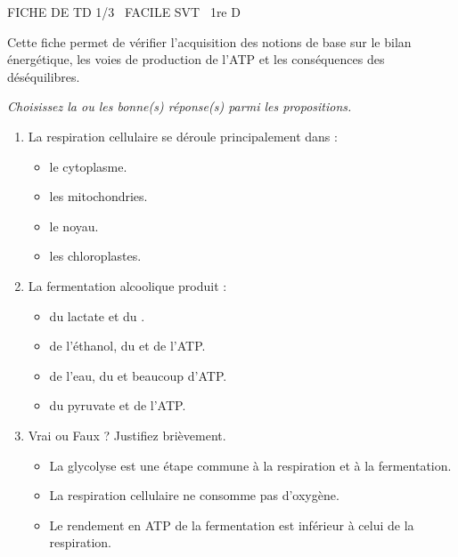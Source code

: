 \documentclass[11pt]{article}
\begin{document}
\begin{tcolorbox}[enhanced,colback=popink,colframe=popink,arc=10pt,boxrule=0pt,left=12pt,right=12pt,top=9pt,bottom=9pt]
{\color{white}\popxbold\small FICHE DE TD 1/3 \textbullet\ FACILE \hfill SVT \textbullet\ 1re D\par}
\end{tcolorbox}
\vspace{4pt}
Cette fiche permet de vérifier l'acquisition des notions de base sur le bilan énergétique, les voies de production de l'ATP et les conséquences des déséquilibres.

\begin{exercice}
\emph{Choisissez la ou les bonne(s) réponse(s) parmi les propositions.}
\begin{enumerate}
    \item La respiration cellulaire se déroule principalement dans :
    \begin{itemize}
        \item[A.] le cytoplasme.
        \item[B.] les mitochondries.
        \item[C.] le noyau.
        \item[D.] les chloroplastes.
    \end{itemize}
    \item La fermentation alcoolique produit :
    \begin{itemize}
        \item[A.] du lactate et du .
        \item[B.] de l'éthanol, du  et de l'ATP.
        \item[C.] de l'eau, du  et beaucoup d'ATP.
        \item[D.] du pyruvate et de l'ATP.
    \end{itemize}
    \item Vrai ou Faux ? Justifiez brièvement.
    \begin{itemize}
        \item[1.] La glycolyse est une étape commune à la respiration et à la fermentation.
        \item[2.] La respiration cellulaire ne consomme pas d'oxygène.
        \item[3.] Le rendement en ATP de la fermentation est inférieur à celui de la respiration.
    \end{itemize}
\end{enumerate}
\end{exercice}
\end{document}
